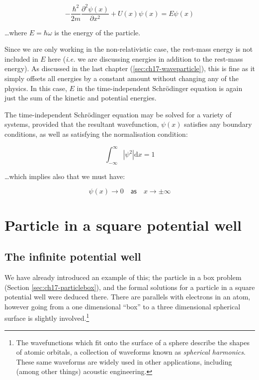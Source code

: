 \documentclass[
]{book}
\begin{document}
\begin{equation}
-\frac{\hbar^2}{2m} \frac{\partial^2 \psi(x)}{\partial x^2} + U(x) \psi(x) =  E \psi(x)
\label{eq:ch18-schrodingerti2}
\end{equation}

\ldots where \(E = \hbar \omega\) is the energy of the particle.

Since we are only working in the non-relativistic case, the rest-mass energy is not included in \(E\) here (\emph{i.e.} we are discussing energies in addition to the rest-mass energy). As discussed in the last chapter (\ref{sec:ch17-waveparticle}), this is fine as it simply offsets all energies by a constant amount without changing any of the physics. In this case, \(E\) in the time-independent Schrödinger equation is again just the sum of the kinetic and potential energies.

The time-independent Schrödinger equation may be solved for a variety of systems, provided that the resultant wavefunction, \(\psi(x)\) satisfies any boundary conditions, as well as satisfying the normalisation condition:

\begin{equation}
\int_{-\infty}^{\infty} |\psi^2| \mathrm{d}x = 1
\end{equation}

\ldots which implies also that we must have:

\begin{equation}
\psi(x) \rightarrow 0 \quad \textsf{as} \quad x \rightarrow \pm \infty
\end{equation}

\hypertarget{sec:ch18-partsquarewell1}{%
\section{Particle in a square potential well}\label{sec:ch18-partsquarewell1}}

\hypertarget{the-infinite-potential-well}{%
\subsection{The infinite potential well}\label{the-infinite-potential-well}}

We have already introduced an example of this; the particle in a box problem (Section \ref{sec:ch17-particlebox}), and the formal solutions for a particle in a square potential well were deduced there. There are parallels with electrons in an atom, however going from a one dimensional ``box'' to a three dimensional spherical surface is slightly involved.\footnote{The wavefunctions which fit onto the surface of a sphere describe the shapes of atomic orbitals, a collection of waveforms known as \emph{spherical harmonics}. These same waveforms are widely used in other applications, including (among other things) acoustic engineering.}
\end{document}
